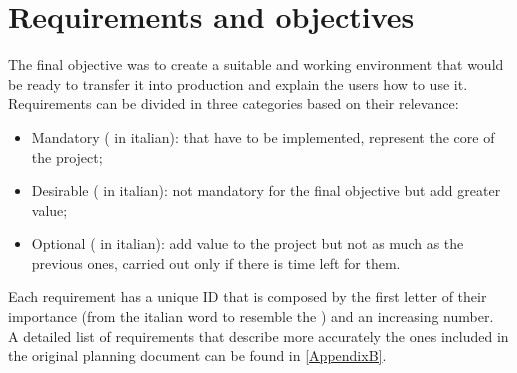\section{Requirements and objectives}
	The final objective was to create a suitable and working environment that would be ready to transfer it into production and explain the users how to use it.\\
	Requirements can be divided in three categories based on their relevance:
	\begin{itemize}
		\item Mandatory ( in italian): that have to be implemented, represent the core of the project;
		\item Desirable ( in italian): not mandatory for the final objective but add greater value;
		\item Optional ( in italian): add value to the project but not as much as the previous ones, carried out only if there is time left for them.
	\end{itemize}
	Each requirement has a unique ID that is composed by the first letter of their importance (from the italian word to resemble the ) and an increasing number.\\
	A detailed list of requirements that describe more accurately the ones included in the original planning document can be found in \ref{AppendixB}.
	
